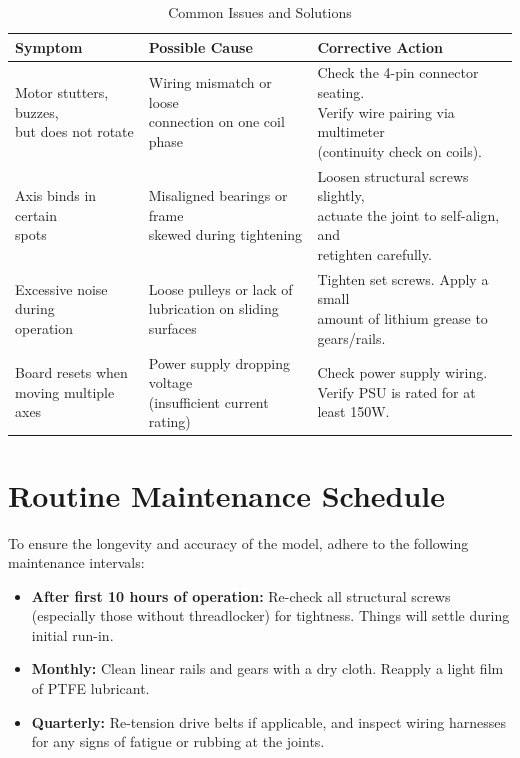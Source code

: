 \documentclass[11pt, a4paper]{article}
\begin{document}
\begin{table}[H]
    \centering
    \renewcommand{\arraystretch}{1.5}
    \begin{tabular}{lll}
        \toprule
        \textbf{Symptom} & \textbf{Possible Cause} & \textbf{Corrective Action} \\
        \midrule
        \makecell[l]{Motor stutters, buzzes,\\but does not rotate} & \makecell[l]{Wiring mismatch or loose\\connection on one coil phase} & \makecell[l]{Check the 4-pin connector seating.\\Verify wire pairing via multimeter\\(continuity check on coils).} \\
        \hline
        \makecell[l]{Axis binds in certain\\spots} & \makecell[l]{Misaligned bearings or frame\\skewed during tightening} & \makecell[l]{Loosen structural screws slightly,\\actuate the joint to self-align, and\\retighten carefully.} \\
        \hline
        \makecell[l]{Excessive noise during\\operation} & \makecell[l]{Loose pulleys or lack of\\lubrication on sliding surfaces} & \makecell[l]{Tighten set screws. Apply a small\\amount of lithium grease to\\gears/rails.} \\
        \hline
        \makecell[l]{Board resets when\\moving multiple axes} & \makecell[l]{Power supply dropping voltage\\(insufficient current rating)} & \makecell[l]{Check power supply wiring.\\Verify PSU is rated for at least 150W.} \\
        \bottomrule
    \end{tabular}
    \caption{Common Issues and Solutions}
\end{table}

\section{Routine Maintenance Schedule}
To ensure the longevity and accuracy of the model, adhere to the following maintenance intervals:
\begin{itemize}[label={\color{primary}\textbullet}]
    \item \textbf{After first 10 hours of operation:} Re-check all structural screws (especially those without threadlocker) for tightness. Things will settle during initial run-in.
    \item \textbf{Monthly:} Clean linear rails and gears with a dry cloth. Reapply a light film of PTFE lubricant.
    \item \textbf{Quarterly:} Re-tension drive belts if applicable, and inspect wiring harnesses for any signs of fatigue or rubbing at the joints.
\end{itemize}
\end{document}
